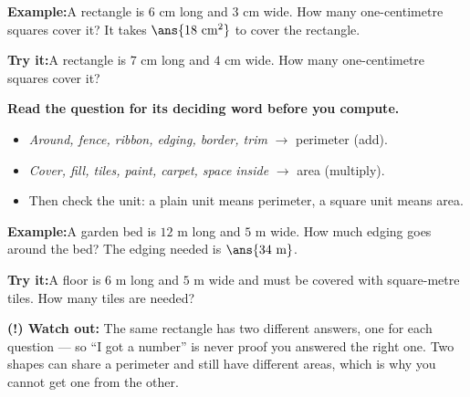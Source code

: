 \documentclass[12pt]{article}
\begin{document}
\begin{examplebox}
\textbf{Example:}\quad A rectangle is $6$ cm long and $3$ cm wide. How many
one-centimetre squares cover it?
It takes $\ans{18\ \text{cm}^2}$ to cover the rectangle.
\end{examplebox}

\begin{tryitbox}
\textbf{Try it:}\quad A rectangle is $7$ cm long and $4$ cm wide. How many
one-centimetre squares cover it?\\[2pt]
\end{tryitbox}


\begin{formulabox}
\textbf{Read the question for its deciding word before you compute.}
\begin{itemize}[leftmargin=0.8cm, itemsep=1pt, topsep=2pt]
  \item \emph{Around, fence, ribbon, edging, border, trim} $\rightarrow$ perimeter (add).
  \item \emph{Cover, fill, tiles, paint, carpet, space inside} $\rightarrow$ area (multiply).
  \item Then check the unit: a plain unit means perimeter, a square unit means area.
\end{itemize}
\end{formulabox}

\begin{examplebox}
\textbf{Example:}\quad A garden bed is $12$ m long and $5$ m wide. How much
edging goes around the bed?
The edging needed is $\ans{34\ \text{m}}$.
\end{examplebox}

\begin{tryitbox}
\textbf{Try it:}\quad A floor is $6$ m long and $5$ m wide and must be covered
with square-metre tiles. How many tiles are needed?\\[2pt]
\end{tryitbox}

\begin{watchoutbox}
\textbf{(!) Watch out:} The same rectangle has two different answers, one for
each question --- so ``I got a number'' is never proof you answered the right
one. Two shapes can share a perimeter and still have different areas, which is
why you cannot get one from the other.
\end{watchoutbox}
\end{document}
